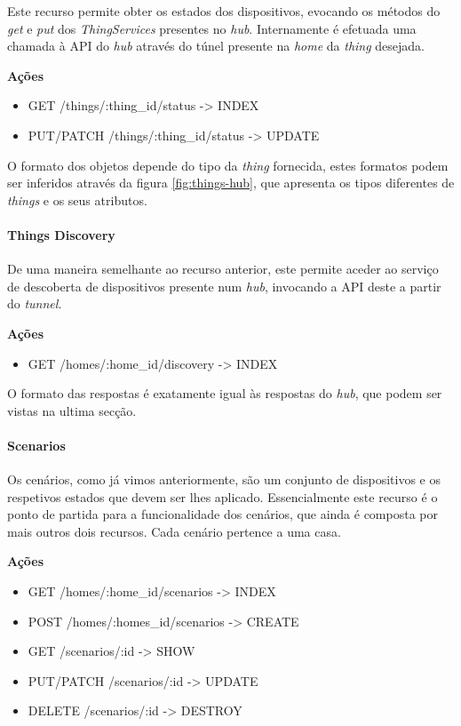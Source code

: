 Este recurso permite obter os estados dos dispositivos, evocando os métodos do \textit{get} e \textit{put} dos \textit{ThingServices} presentes no \textit{hub}. Internamente é efetuada uma chamada à API do \textit{hub} através do túnel presente na \textit{home} da \textit{thing} desejada.

\textbf{Ações}
\begin{itemize}
    \item GET /things/:thing\_id/status -> INDEX
    \item PUT/PATCH /things/:thing\_id/status -> UPDATE
\end{itemize}

O formato dos objetos depende do tipo da \textit{thing} fornecida, estes formatos podem ser inferidos através da figura \ref{fig:things-hub}, que apresenta os tipos diferentes de \textit{things} e os seus atributos.

\paragraph*{Things Discovery}

De uma maneira semelhante ao recurso anterior, este permite aceder ao serviço de descoberta de dispositivos presente num \textit{hub}, invocando a API deste a partir do \textit{tunnel}.

\textbf{Ações}
\begin{itemize}
    \item GET /homes/:home\_id/discovery -> INDEX
\end{itemize}

O formato das respostas é exatamente igual às respostas do \textit{hub}, que podem ser vistas na ultima secção.


\paragraph*{Scenarios}

Os cenários, como já vimos anteriormente, são um conjunto de dispositivos e os respetivos estados que devem ser lhes aplicado. Essencialmente este recurso é o ponto de partida para a funcionalidade dos cenários, que ainda é composta por mais outros dois recursos. Cada cenário pertence a uma casa.

\textbf{Ações}
\begin{itemize}
    \item GET /homes/:home\_id/scenarios -> INDEX
    \item POST /homes/:homes\_id/scenarios -> CREATE
    \item GET /scenarios/:id -> SHOW
    \item PUT/PATCH /scenarios/:id -> UPDATE
    \item DELETE /scenarios/:id -> DESTROY
\end{itemize}

